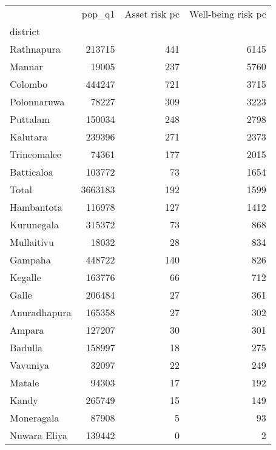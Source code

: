 \begin{tabular}{lrrr}
\toprule
{} &   pop\_q1 &  Asset risk pc &  Well-being risk pc \\
district     &          &                &                     \\
\midrule
Rathnapura   &   213715 &            441 &                6145 \\
Mannar       &    19005 &            237 &                5760 \\
Colombo      &   444247 &            721 &                3715 \\
Polonnaruwa  &    78227 &            309 &                3223 \\
Puttalam     &   150034 &            248 &                2798 \\
Kalutara     &   239396 &            271 &                2373 \\
Trincomalee  &    74361 &            177 &                2015 \\
Batticaloa   &   103772 &             73 &                1654 \\
Total        &  3663183 &            192 &                1599 \\
Hambantota   &   116978 &            127 &                1412 \\
Kurunegala   &   315372 &             73 &                 868 \\
Mullaitivu   &    18032 &             28 &                 834 \\
Gampaha      &   448722 &            140 &                 826 \\
Kegalle      &   163776 &             66 &                 712 \\
Galle        &   206484 &             27 &                 361 \\
Anuradhapura &   165358 &             27 &                 302 \\
Ampara       &   127207 &             30 &                 301 \\
Badulla      &   158997 &             18 &                 275 \\
Vavuniya     &    32097 &             22 &                 249 \\
Matale       &    94303 &             17 &                 192 \\
Kandy        &   265749 &             15 &                 149 \\
Moneragala   &    87908 &              5 &                  93 \\
Nuwara Eliya &   139442 &              0 &                   2 \\
\bottomrule
\end{tabular}
